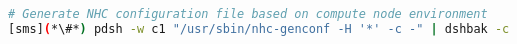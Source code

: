 \begin{lstlisting}[language=bash,keywords={},upquote=true]

# Generate NHC configuration file based on compute node environment
[sms](*\#*) pdsh -w c1 "/usr/sbin/nhc-genconf -H '*' -c -" | dshbak -c 

\end{lstlisting}

